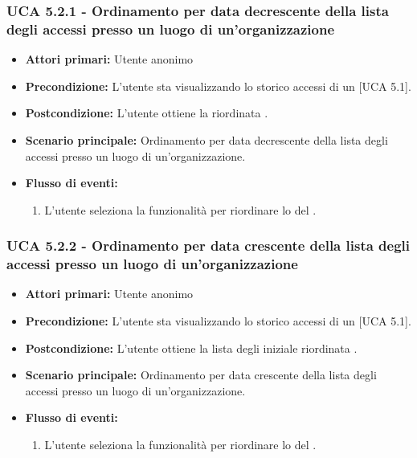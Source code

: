 \subsubsection{UCA 5.2.1 - Ordinamento per data decrescente della lista degli accessi presso un luogo di un'organizzazione}
\begin{itemize}
    \item \textbf{Attori primari:} Utente anonimo
    \item \textbf{Precondizione:} L'utente sta visualizzando lo storico accessi di un  [UCA 5.1].
    \item \textbf{Postcondizione:} L'utente ottiene la  riordinata .
    \item \textbf{Scenario principale:} Ordinamento per data decrescente della lista degli accessi presso un luogo di un'organizzazione.
    \item \textbf{Flusso di eventi:}
    \begin{enumerate}
        \item L'utente seleziona la funzionalità per riordinare lo  del  .
    \end{enumerate}
\end{itemize}

\subsubsection{UCA 5.2.2 - Ordinamento per data crescente della lista degli accessi presso un luogo di un'organizzazione}
\begin{itemize}
    \item \textbf{Attori primari:} Utente anonimo
    \item \textbf{Precondizione:} L'utente sta visualizzando lo storico accessi di un  [UCA 5.1].
    \item \textbf{Postcondizione:} L'utente ottiene la lista degli iniziale riordinata .
    \item \textbf{Scenario principale:} Ordinamento per data crescente della lista degli accessi presso un luogo di un'organizzazione.
    \item \textbf{Flusso di eventi:}
    \begin{enumerate}
        \item L'utente seleziona la funzionalità per riordinare lo  del  .
    \end{enumerate}
\end{itemize}

